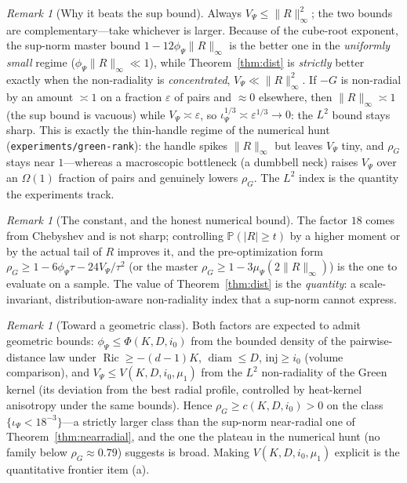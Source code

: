 \documentclass[11pt]{article}
\theoremstyle{remark}
\newtheorem{remark}[theorem]{Remark}
\newcommand{\diam}{\operatorname{diam}}
\newcommand{\Rem}{R}
\newcommand{\rhoG}{\rho_G}
\DeclareMathOperator{\Ric}{Ric}
\begin{document}
\begin{remark}[Why it beats the sup bound]
Always $V_\Psi\le\lVert\Rem\rVert_\infty^2$; the two bounds are complementary---take whichever
is larger. Because of the cube-root exponent, the sup-norm master bound $1-12\phi_\Psi
\lVert\Rem\rVert_\infty$ is the better one in the \emph{uniformly small} regime
($\phi_\Psi\lVert\Rem\rVert_\infty\ll1$), while Theorem~\ref{thm:dist} is \emph{strictly}
better exactly when the non-radiality is \emph{concentrated}, $V_\Psi\ll\lVert\Rem\rVert_\infty^2$.
If $-G$ is non-radial by an amount $\asymp1$ on a fraction $\varepsilon$ of pairs and
$\approx0$ elsewhere, then $\lVert\Rem\rVert_\infty\asymp1$ (the sup bound is vacuous) while
$V_\Psi\asymp\varepsilon$, so $\iota_\Psi^{1/3}\asymp\varepsilon^{1/3}\to0$: the $L^2$ bound
stays sharp. This is exactly the thin-handle regime of the numerical hunt
(\texttt{experiments/green-rank}): the handle spikes $\lVert\Rem\rVert_\infty$ but leaves
$V_\Psi$ tiny, and $\rhoG$ stays near $1$---whereas a macroscopic bottleneck (a dumbbell
neck) raises $V_\Psi$ over an $\Omega(1)$ fraction of pairs and genuinely lowers $\rhoG$.
The $L^2$ index is the quantity the experiments track.
\end{remark}

\begin{remark}[The constant, and the honest numerical bound]
The factor $18$ comes from Chebyshev and is not sharp; controlling
$\mathbb P(\lvert\Rem\rvert\ge t)$ by a higher moment or by the actual tail of $\Rem$
improves it, and the pre-optimization form $\rhoG\ge1-6\phi_\Psi\tau-24V_\Psi/\tau^2$ (or
the master $\rhoG\ge1-3\mu_\Psi(2\lVert\Rem\rVert_\infty)$) is the one to evaluate on a
sample. The value of Theorem~\ref{thm:dist} is the \emph{quantity}: a scale-invariant,
distribution-aware non-radiality index that a sup-norm cannot express.
\end{remark}

\begin{remark}[Toward a geometric class]
Both factors are expected to admit geometric bounds: $\phi_\Psi\le\Phi(K,D,i_0)$ from the bounded density
of the pairwise-distance law under $\Ric\ge-(d-1)K$, $\diam\le D$, $\mathrm{inj}\ge i_0$
(volume comparison), and $V_\Psi\le V(K,D,i_0,\mu_1)$ from the $L^2$ non-radiality of the
Green kernel (its deviation from the best radial profile, controlled by heat-kernel
anisotropy under the same bounds). Hence $\rhoG\ge c(K,D,i_0)>0$ on the class
$\{\iota_\Psi<18^{-3}\}$---a strictly larger class than the sup-norm near-radial one of
Theorem~\ref{thm:nearradial}, and the one the plateau in the numerical hunt (no family below
$\rhoG\approx0.79$) suggests is broad. Making $V(K,D,i_0,\mu_1)$ explicit is the quantitative
frontier item (a).
\end{remark}
\end{document}
